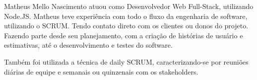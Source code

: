 Matheus Mello Nascimento atuou como Desenvolvedor Web Full-Stack, utilizando
Node.JS. Matheus teve experiência com todo o fluxo da engenharia de software, utilizando o SCRUM.
Tendo contato direto com os clientes ou donos do projeto. Fazendo parte desde seu planejamento, com a criação
de histórias de usuário e estimativas, até o desenvolvimento e testes do software.

Também foi utilizada a técnica de daily SCRUM, caracterizando-se por reuniões diárias de equipe e semanais ou quinzenais com os stakeholders.





